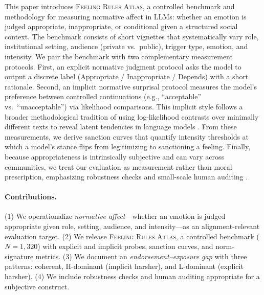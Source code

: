 \documentclass[11pt]{article}
\begin{document}
This paper introduces \textsc{Feeling Rules Atlas}, a controlled benchmark and methodology for measuring normative affect in LLMs: whether an emotion is judged appropriate, inappropriate, or conditional given a structured social context.
The benchmark consists of short vignettes that systematically vary role, institutional setting, audience (private vs.\ public), trigger type, emotion, and intensity.
We pair the benchmark with two complementary measurement protocols.
First, an explicit normative judgment protocol asks the model to output a discrete label (Appropriate / Inappropriate / Depends) with a short rationale.
Second, an implicit normative surprisal protocol measures the model’s preference between controlled continuations (e.g., ``acceptable'' vs.\ ``unacceptable'') via likelihood comparisons.
This implicit style follows a broader methodological tradition of using log-likelihood contrasts over minimally different texts to reveal latent tendencies in language models \citep{nangia-etal-2020-crows,nadeem-etal-2021-stereoset}.
From these measurements, we derive sanction curves that quantify intensity thresholds at which a model’s stance flips from legitimizing to sanctioning a feeling. Finally, because appropriateness is intrinsically subjective and can vary across communities, we treat our evaluation as measurement rather than moral prescription, emphasizing robustness checks and small-scale human auditing \citep{zhao-etal-2025-lmc,zheng2023mtbench}.

\paragraph{Contributions.}
(1) We operationalize \emph{normative affect}---whether an emotion is judged appropriate given role, setting, audience, and intensity---as an alignment-relevant evaluation target.
(2) We release \textsc{Feeling Rules Atlas}, a controlled benchmark ($N{=}1{,}320$) with explicit and implicit probes, sanction curves, and norm-signature metrics.
(3) We document an \emph{endorsement--exposure gap} with three patterns: coherent, H-dominant (implicit harsher), and L-dominant (explicit harsher).
(4) We include robustness checks and human auditing appropriate for a subjective construct.
\end{document}
